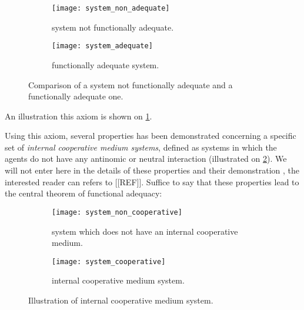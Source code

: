 
\begin{figure}
\centering

	\begin{subfigure}[b]{0.45\textwidth}
		\centering
		\texttt{[image: system\_non\_adequate]}
		\caption{system not functionally adequate.}
	\end{subfigure}
	\hfill
	\begin{subfigure}[b]{0.45\textwidth}
		\centering
		\texttt{[image: system\_adequate]}
		\caption{functionally adequate system.}
	\end{subfigure}
	
\caption{Comparison of a system not functionally adequate and a functionally adequate one.}
\label{adequacy_comp}
\end{figure}

An illustration this axiom is shown on \figurename{} \ref{adequacy_comp}.


Using this axiom, several properties has been demonstrated concerning a specific set of \emph{internal cooperative medium systems}, defined as systems in which the agents do not have any antinomic or neutral interaction (illustrated on \figurename{} \ref{internal_cooperative_comp}). We will not enter here in the details of these properties and their demonstration
, the interested reader can refers to [[REF]]. Suffice to say that these properties lead to the central theorem of functional adequacy:


\begin{figure}
\centering

	\begin{subfigure}[b]{0.35\textwidth}
		\centering
		\texttt{[image: system\_non\_cooperative]}
		\caption{system which does not have an internal cooperative medium.}
	\end{subfigure}
	\hfill
	\begin{subfigure}[b]{0.35\textwidth}
		\centering
		\texttt{[image: system\_cooperative]}
		\caption{internal cooperative medium system.}
	\end{subfigure}
	
\caption{Illustration of internal cooperative medium system.}
\label{internal_cooperative_comp}
\end{figure}

